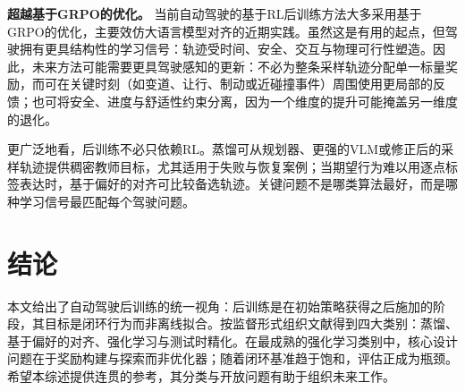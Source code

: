 \documentclass[runningheads]{llncs}
\begin{document}
\textbf{超越基于GRPO的优化。}
当前自动驾驶的基于RL后训练方法大多采用基于GRPO的优化，主要效仿大语言模型对齐的近期实践。虽然这是有用的起点，但驾驶拥有更具结构性的学习信号：轨迹受时间、安全、交互与物理可行性塑造。因此，未来方法可能需要更具驾驶感知的更新：不必为整条采样轨迹分配单一标量奖励，而可在关键时刻（如变道、让行、制动或近碰撞事件）周围使用更局部的反馈；也可将安全、进度与舒适性约束分离，因为一个维度的提升可能掩盖另一维度的退化。

更广泛地看，后训练不必只依赖RL。蒸馏可从规划器、更强的VLM或修正后的采样轨迹提供稠密教师目标，尤其适用于失败与恢复案例；当期望行为难以用逐点标签表达时，基于偏好的对齐可比较备选轨迹。关键问题不是哪类算法最好，而是哪种学习信号最匹配每个驾驶问题。


\section{结论}
\label{sec:conclusion}

本文给出了自动驾驶后训练的统一视角：后训练是在初始策略获得之后施加的阶段，其目标是闭环行为而非离线拟合。按监督形式组织文献得到四大类别：蒸馏、基于偏好的对齐、强化学习与测试时精化。在最成熟的强化学习类别中，核心设计问题在于奖励构建与探索而非优化器；随着闭环基准趋于饱和，评估正成为瓶颈。希望本综述提供连贯的参考，其分类与开放问题有助于组织未来工作。





\end{document}
